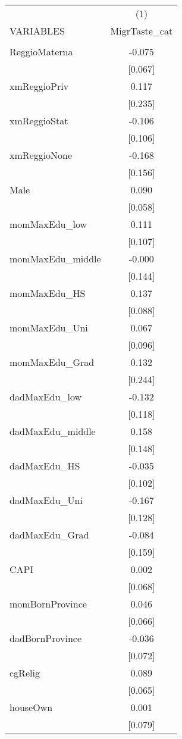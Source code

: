 \documentclass[]{article}
\begin{document}
\begin{tabular}{lc} \hline
 & (1) \\
VARIABLES & MigrTaste\_cat \\ \hline
 &  \\
ReggioMaterna & -0.075 \\
 & [0.067] \\
xmReggioPriv & 0.117 \\
 & [0.235] \\
xmReggioStat & -0.106 \\
 & [0.106] \\
xmReggioNone & -0.168 \\
 & [0.156] \\
Male & 0.090 \\
 & [0.058] \\
momMaxEdu\_low & 0.111 \\
 & [0.107] \\
momMaxEdu\_middle & -0.000 \\
 & [0.144] \\
momMaxEdu\_HS & 0.137 \\
 & [0.088] \\
momMaxEdu\_Uni & 0.067 \\
 & [0.096] \\
momMaxEdu\_Grad & 0.132 \\
 & [0.244] \\
dadMaxEdu\_low & -0.132 \\
 & [0.118] \\
dadMaxEdu\_middle & 0.158 \\
 & [0.148] \\
dadMaxEdu\_HS & -0.035 \\
 & [0.102] \\
dadMaxEdu\_Uni & -0.167 \\
 & [0.128] \\
dadMaxEdu\_Grad & -0.084 \\
 & [0.159] \\
CAPI & 0.002 \\
 & [0.068] \\
momBornProvince & 0.046 \\
 & [0.066] \\
dadBornProvince & -0.036 \\
 & [0.072] \\
cgRelig & 0.089 \\
 & [0.065] \\
houseOwn & 0.001 \\
 & [0.079] \\

\end{tabular}
\end{document}
